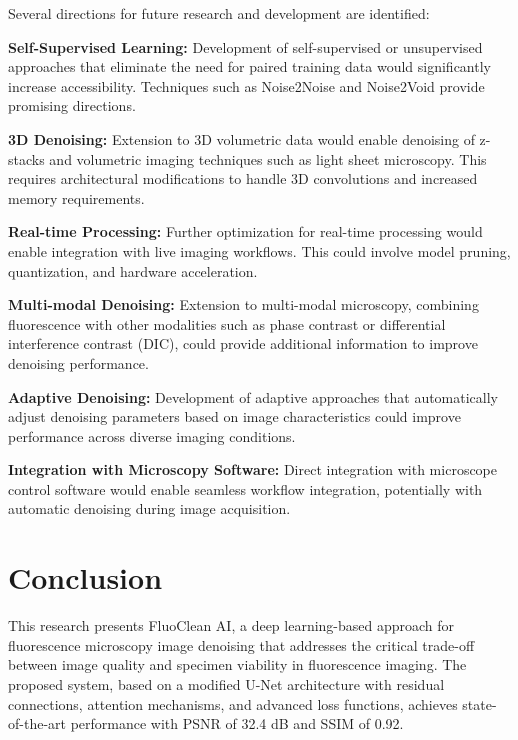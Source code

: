 \documentclass[12pt,a4paper]{report}
\begin{document}
Several directions for future research and development are identified:

\vspace{0.5cm}

\textbf{Self-Supervised Learning:} Development of self-supervised or unsupervised approaches that eliminate the need for paired training data would significantly increase accessibility. Techniques such as Noise2Noise and Noise2Void provide promising directions.

\vspace{0.5cm}

\textbf{3D Denoising:} Extension to 3D volumetric data would enable denoising of z-stacks and volumetric imaging techniques such as light sheet microscopy. This requires architectural modifications to handle 3D convolutions and increased memory requirements.

\vspace{0.5cm}

\textbf{Real-time Processing:} Further optimization for real-time processing would enable integration with live imaging workflows. This could involve model pruning, quantization, and hardware acceleration.

\vspace{0.5cm}

\textbf{Multi-modal Denoising:} Extension to multi-modal microscopy, combining fluorescence with other modalities such as phase contrast or differential interference contrast (DIC), could provide additional information to improve denoising performance.

\vspace{0.5cm}

\textbf{Adaptive Denoising:} Development of adaptive approaches that automatically adjust denoising parameters based on image characteristics could improve performance across diverse imaging conditions.

\vspace{0.5cm}

\textbf{Integration with Microscopy Software:} Direct integration with microscope control software would enable seamless workflow integration, potentially with automatic denoising during image acquisition.

\chapter{Conclusion}
\label{chap:conclusion}

This research presents FluoClean AI, a deep learning-based approach for fluorescence microscopy image denoising that addresses the critical trade-off between image quality and specimen viability in fluorescence imaging. The proposed system, based on a modified U-Net architecture with residual connections, attention mechanisms, and advanced loss functions, achieves state-of-the-art performance with PSNR of 32.4 dB and SSIM of 0.92.
\end{document}
